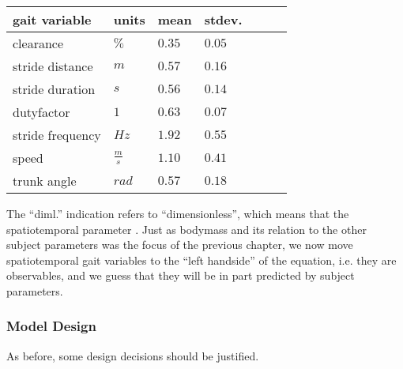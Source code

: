 \begin{table}[p]
\caption{\label{tab:spatiotemporals}}
\centering
\begin{tabular}{l|llllll}
\textbf{gait variable} & \textbf{units}  & \textbf{mean} & \textbf{stdev.} \\[0pt]
\hline
clearance              & \(\%\)          & \(0.35\) & \(0.05\) \\[0pt]
stride distance        & \(m\)           & \(0.57\) & \(0.16\) \\[0pt]
stride duration        & \(s\)           & \(0.56\) & \(0.14\) \\[0pt]
dutyfactor             & \(1\)           & \(0.63\) & \(0.07\) \\[0pt]
stride frequency       & \(Hz\)          & \(1.92\) & \(0.55\) \\[0pt]
speed                  & \(\frac{m}{s}\) & \(1.10\) & \(0.41\) \\[0pt]
trunk angle            & \(rad\)         & \(0.57\) & \(0.18\) \\[0pt]
\end{tabular}
\end{table}


The ``diml.'' indication refers to ``dimensionless'', which means that the spatiotemporal parameter  \citep[see Ch. \ref{prep:dimensionless};][]{Hof1996,Alexander1983}.
Just as bodymass and its relation to the other subject parameters was the focus of the previous chapter, we now move spatiotemporal gait variables to the ``left handside'' of the equation, i.e. they are observables, and we guess that they will be in part predicted by subject parameters.



\subsubsection{Model Design}
\label{sec:org554cfcf}
As before, some design decisions should be justified.

